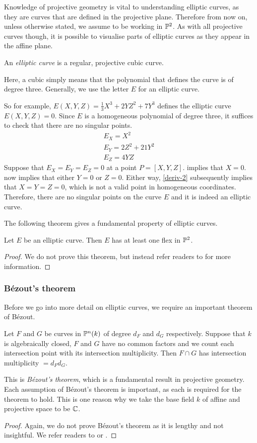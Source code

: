 Knowledge of projective geometry is vital to understanding elliptic curves, as they are curves that are defined in the projective plane.
Therefore from now on, unless otherwise stated, we assume to be working in $\pn[2]$.
As with all projective curves though, it is possible to visualise parts of elliptic curves as they appear in the affine plane.
\begin{definition}
	An \emph{elliptic curve} is a regular, projective cubic curve.
\end{definition}
Here, a cubic simply means that the polynomial that defines the curve is of degree three.
Generally, we use the letter $E$ for an elliptic curve.

So for example, $E(X,Y,Z) = \frac{1}{3}X^3 + 2YZ^2 + 7Y^3$ defines the elliptic curve $E(X,Y,Z) = 0$.
Since $E$ is a homogeneous polynomial of degree three, it suffices to check that there are no singular points.
\begin{align}
	E_X = X^2 \label{deriv-1}\\
	E_Y = 2Z^2 + 21Y^2 \label{deriv-2}\\
	E_Z = 4YZ \label{deriv-3}
\end{align}
Suppose that $E_X = E_Y = E_Z = 0$ at a point $P = [X,Y,Z]$.
 implies that $X=0$.
 now implies that either $Y=0$ or $Z=0$.
Either way, \cref{deriv-2} subsequently implies that $X = Y = Z = 0$, which is not a valid point in homogeneous coordinates.
Therefore, there are no singular points on the curve $E$ and it is indeed an elliptic curve.

The following theorem gives a fundamental property of elliptic curves.
\begin{theorem}
	Let $E$ be an elliptic curve.
	Then $E$ has at least one flex in $\pn[2]$.
	\label{flex-existence}
\end{theorem}
\begin{proof}
	We do not prove this theorem, but instead refer readers to \cite[§12]{bix2006} for more information.
\end{proof}
\subsubsection{Bézout's theorem}
Before we go into more detail on elliptic curves, we require an important theorem of Bézout.
\begin{theorem}
	Let $F$ and $G$ be curves in $\pn(k)$ of degree $d_F$ and $d_G$ respectively.
	Suppose that $k$ is algebraically closed, $F$ and $G$ have no common factors and we count each intersection point with its intersection multiplicity.
	Then $F \cap G$ has intersection multiplicity $= d_F d_G$.
	\label{bezouts-theorem}
\end{theorem}
This is \emph{Bézout's theorem}, which is a fundamental result in projective geometry.
Each assumption of Bézout's theorem is important, as each is required for the theorem to hold.
This is one reason why we take the base field $k$ of affine and projective space to be $\C$.
\begin{proof}
	Again, we do not prove Bézout's theorem as it is lengthy and not insightful.
	We refer readers to \cite{silverman2009} or \cite{bix2006}.
\end{proof}
